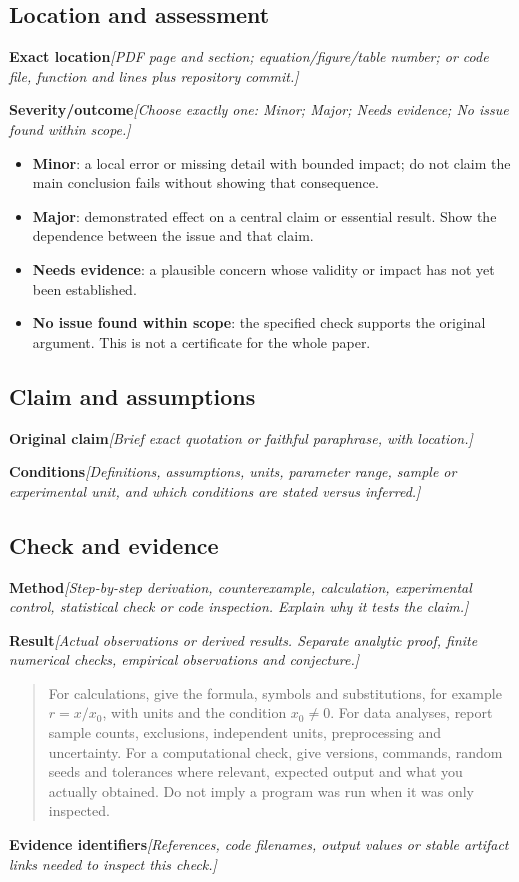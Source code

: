 \documentclass[11pt]{article}
\newcommand{\prompt}[1]{\textit{\textcolor{promptink}{[#1]}}}
\newcommand{\entry}[2]{\textbf{#1}\quad\prompt{#2}\par}
\newcommand{\guidance}[1]{\begin{quote}\small #1\end{quote}}
\begin{document}
\subsection{Location and assessment}
\entry{Exact location}{PDF page and section; equation/figure/table number; or code
file, function and lines plus repository commit.}
\entry{Severity/outcome}{Choose exactly one: Minor; Major; Needs evidence;
No issue found within scope.}
\begin{itemize}
\item \textbf{Minor}: a local error or missing detail with bounded impact;
do not claim the main conclusion fails without showing that consequence.
\item \textbf{Major}: demonstrated effect on a central claim or essential result.
Show the dependence between the issue and that claim.
\item \textbf{Needs evidence}: a plausible concern whose validity or impact
has not yet been established.
\item \textbf{No issue found within scope}: the specified check supports the
original argument. This is not a certificate for the whole paper.
\end{itemize}

\subsection{Claim and assumptions}
\entry{Original claim}{Brief exact quotation or faithful paraphrase, with location.}
\entry{Conditions}{Definitions, assumptions, units, parameter range, sample or
experimental unit, and which conditions are stated versus inferred.}

\subsection{Check and evidence}
\entry{Method}{Step-by-step derivation, counterexample, calculation, experimental
control, statistical check or code inspection. Explain why it tests the claim.}
\entry{Result}{Actual observations or derived results. Separate analytic proof,
finite numerical checks, empirical observations and conjecture.}
\guidance{For calculations, give the formula, symbols and substitutions, for example
\(r=x/x_0\), with units and the condition \(x_0\ne 0\). For data analyses, report
sample counts, exclusions, independent units, preprocessing and uncertainty.
For a computational check, give versions, commands, random seeds and tolerances where relevant,
expected output and what you actually obtained. Do not imply a program was run
when it was only inspected.}
\entry{Evidence identifiers}{References, code filenames, output values or stable
artifact links needed to inspect this check.}
\end{document}
